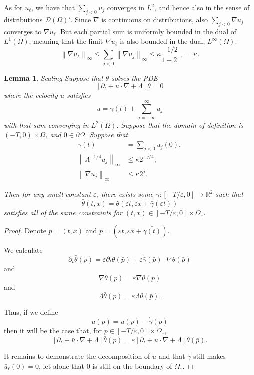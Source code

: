 \documentclass[11pt]{amsart}
\newtheorem{lemma}[theorem]{Lemma}
\theoremstyle{remark}
\newcommand{\R}{\mathbb{R}}
\newcommand{\eps}{\varepsilon}
\newcommand{\norm}[1]{\left\lVert#1\right\rVert}
\newcommand{\bracket}[1]{\left[ #1 \right]}
\newcommand{\del}{\partial}
\newcommand{\grad}{\nabla}
\newcommand{\test}{\mathcal{D}}
\begin{document}
As for $u_\ell$, we have that $\sum_{j < 0} u_j$ converges in $L^2$, and hence also in the sense of distributions $\test(\Omega)'$.  Since $\grad$ is continuous on distributions, also $\sum_{j<0} \grad u_j$ converges to $\grad u_\ell$.  But each partial sum is uniformly bounded in the dual of $L^1(\Omega)$, meaning that the limit $\grad u_\ell$ is also bounded in the dual, $L^\infty(\Omega)$.  
\[ \norm{\grad u_\ell}_\infty \leq \sum_{j < 0} \norm{\grad u_j}_\infty \leq \kappa \frac{1/2}{1 - 2^{-1}} = \kappa. \]

\begin{lemma}{Scaling}
Suppose that $\theta$ solves the PDE
\[ \bracket{\del_t + u\cdot\grad + \Lambda} \theta = 0\]
where the velocity $u$ satisfies
\[ u = \gamma(t) + \sum_{j=-\infty}^\infty u_j \]
with that sum converging in $L^2(\Omega)$.  Suppose that the domain of definition is $(-T,0) \times \Omega$, and $0 \in \del \Omega$.  Suppose that
\begin{align*}
\gamma(t) &= \sum_{j<0} u_j(0), \\
\norm{\Lambda^{-1/4} u_j}_\infty &\leq \kappa 2^{-j/4}, \\
\norm{\grad u_j}_\infty &\leq \kappa 2^j.
\end{align*}

Then for any small constant $\eps$, there exists some $\bar{\gamma}: [-T/\eps ,0] \to \R^2$ such that
\[ \bar{\theta}(t,x) = \theta(\eps t, \eps x + \bar{\gamma}(\eps t)) \]
satisfies all of the same constraints for $(t,x) \in [-T/\eps, 0]\times \Omega_\eps$.  
\end{lemma}

\begin{proof}
Denote $p = (t,x)$ and $\bar{p} = (\eps t, \eps x + \bar{\gamma(t)})$.  

We calculate
\[ \del_t \bar{\theta}(p) = \eps \del_t \theta(\bar{p}) + \eps \dot{\bar{\gamma}}(\bar{p}) \cdot \grad \theta (\bar{p}) \]
and 
\[ \grad \bar{\theta}(p) = \eps \grad \theta(\bar{p}) \]
and
\[ \Lambda \bar{\theta}(p) = \eps \Lambda \theta(\bar{p}). \]

Thus, if we define
\[ \bar{u}(p) = u(\bar{p}) - \dot{\bar{\gamma}}(\bar{p}) \]
then it will be the case that, for $p \in [-T/\eps,0]\times \Omega_\eps$, 
\[ \bracket{\del_t + \bar{u}\cdot\grad + \Lambda} \bar{\theta}(p) = \eps \bracket{\del_t + u\cdot\grad + \Lambda} \theta(\bar{p}). \]

It remains to demonstrate the decomposition of $\bar{u}$ and that $\bar{\gamma}$ still makes $\bar{u}_\ell(0)=0$, let alone that $0$ is still on the boundary of $\Omega_\eps$.  
\end{proof}
\end{document}
